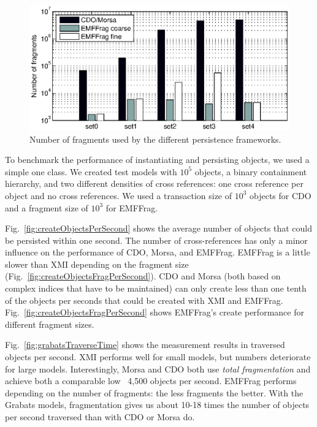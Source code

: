 \begin{figure}[t]
\hspace{0.02\linewidth}
\begin{minipage}[b]{0.48\linewidth}
\centering
\includegraphics[width=\linewidth]{figures/grabatsFragments}
\caption{Number of fragments used by the different persistence frameworks.}
\label{fig:grabatsFragments}
\end{minipage}
\end{figure}

 To benchmark the performance of instantiating and persisting objects, we used a simple one class. We created test models with $10^5$ objects, a binary containment hierarchy, and two different densities of cross references: one cross reference per object and no cross references. We used a transaction size of $10^3$ objects for CDO and a fragment size of $10^3$ for EMFFrag.

Fig.~\ref{fig:createObjectsPerSecond} shows the average number of objects that could be persisted within one second. The number of cross-references has only a minor influence on the performance of CDO, Morsa, and EMFFrag. EMFFrag is a little slower than XMI depending on the fragment size (Fig.~\ref{fig:createObjectsFragPerSecond}). CDO and Morsa (both based on complex indices that have to be maintained) can only create less than one tenth of the objects per seconds that could be created with XMI and EMFFrag. Fig.~\ref{fig:createObjectsFragPerSecond} shows EMFFrag's create performance for different fragment sizes.

 Fig.~\ref{fig:grabatsTraverseTime} shows the measurement results in traversed objects per second. XMI performs well for small models, but numbers deteriorate for large models. Interestingly, Morsa and CDO both use \emph{total fragmentation} and achieve both a comparable low ~4,500 objects per second. EMFFrag performs depending on the number of fragments: the less fragments the better. With the Grabats models, fragmentation gives us about 10-18 times the number of objects per second traversed than with CDO or Morsa do.

